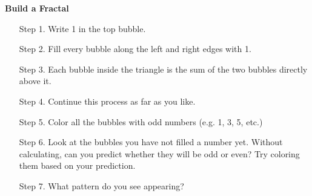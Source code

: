 \documentclass[a4paper]{article}
\begin{document}
\centering
\Huge\textbf{Build a Fractal}
\vspace{1in}
\LARGE
\begin{enumerate}
    \item[Step 1.]{Write 1 in the top bubble.}
    \item[Step 2.]{Fill every bubble along the left and right edges with 1.}
    \item[Step 3.]{Each bubble inside the triangle is the sum of the two bubbles directly above it.}
    \item[Step 4.]{Continue this process as far as you like.}
    \item[Step 5.]{Color all the bubbles with odd numbers (e.g. 1, 3, 5, etc.)}
    \item[Step 6.]{Look at the bubbles you have not filled a number yet. Without calculating, can you predict whether they will be odd or even? Try coloring them based on your prediction.}
    \item[Step 7.]{What pattern do you see appearing?}
\end{enumerate}
\end{document}
